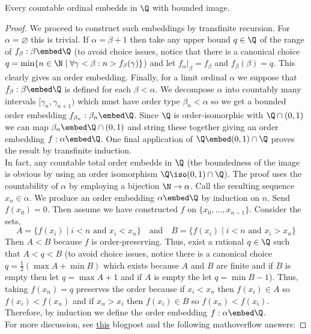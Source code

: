 \documentclass[12pt]{article}
\begin{document}
\begin{prop}
Every countable ordinal embedds in $\Q$ with bounded image.
\end{prop}

\begin{proof}
We proceed to construct such embeddings by transfinite recursion. For $\alpha = \varnothing$ this is trivial. If $\alpha = \beta + 1$ then take any upper bound $q \in \Q$ of the range of $f_\beta : \beta \embed \Q$ (to avoid choice issues, notice that there is a canonical choice $q = \min \{ n \in \N \mid \forall \gamma < \beta : n > f_\beta(\gamma) \}$) and let $f_\alpha |_\beta = f_\beta$ and $f_\beta(\beta) = q$. This clearly gives an order embedding. Finally, for a limit ordinal $\alpha$ we suppose that $f_\beta : \beta \embed \Q$ is defined for each $\beta < \alpha$. We decompose $\alpha$ into countably many intervals $[\gamma_n, \gamma_{n+1})$ which must have order type $\beta_n < \alpha$ so we get a bounded order embedding $f_{\beta_n} : \beta_n \embed \Q$. Since $\Q$ is order-isomorphic with $\Q \cap (0, 1)$ we can map $\beta_n \embed \Q \cap (0,1)$ and string these together giving an order embedding $f : \alpha \embed \Q$. One final application of $\Q \embed (0, 1) \cap \Q$ proves the result by transfinite induction. 
\bigskip\\
In fact, any countable total order embedds in $\Q$ (the boundedness of the image is obvious by using an order isomorphism $\Q \iso (0,1) \cap \Q$). The proof uses the countability of $\alpha$ by employing a  bijection $\N \to \alpha$. Call the resulting sequence $x_n \in \alpha$. We produce an order embedding $\alpha \embed \Q$ by induction on $n$. Send $f(x_0) = 0$. Then assume we have constructed $f$ on $\{x_0, \dots, x_{n-1} \}$. Consider the sets,
\[ A = \{ f(x_i) \mid i < n \text{ and } x_i < x_n \} \quad \text{and} \quad B = \{ f(x_i) \mid i < n \text{ and } x_i > x_n \} \]
Then $A < B$ because $f$ is order-preserving. Thus, exist a rational $q \in \Q$ such that $A < q < B$ (to avoid choice issues, notice there is a canonical choice $q = \tfrac{1}{2} (\max{A} + \min{B})$ which exists because $A$ and $B$ are finite and if $B$ is empty then let $q = \max{A} + 1$ and if $A$ is empty the let $q = \min{B} - 1$). Thus, taking $f(x_n) = q$ preserves the order because if $x_i < x_n$ then $f(x_i) \in A$ so $f(x_i) < f(x_n)$ and if $x_n > x_i$ then $f(x_i) \in B$ so $f(x_n) < f(x_i)$. Therefore, by induction we define the order embedding $f : \alpha \embed \Q$.
\bigskip\\
For more discussion, see \href{https://tinyurl.com/3dub3d9r}{this} blogpost and the following mathoverflow answers:   

\end{proof}
\end{document}
